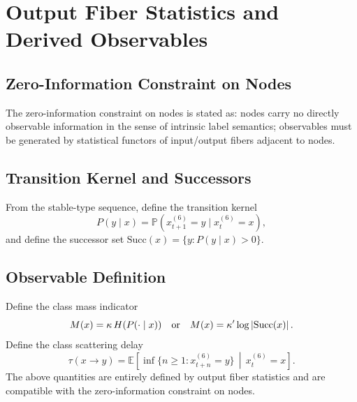 \section{Output Fiber Statistics and Derived Observables}
\label{sec:fiber-observables}

\subsection{Zero-Information Constraint on Nodes}

The zero-information constraint on nodes is stated as: nodes carry no directly observable information in the sense of intrinsic label semantics; observables must be generated by statistical functors of input/output fibers adjacent to nodes.

\subsection{Transition Kernel and Successors}

From the stable-type sequence, define the transition kernel
\[
P(y\mid x)=\mathbb{P}(x_{t+1}^{(6)}=y\mid x_t^{(6)}=x),
\]
and define the successor set $\mathrm{Succ}(x)=\{y:P(y\mid x)>0\}$.

\subsection{Observable Definition}

Define the class mass indicator
\[
M(x)=\kappa\,H(P(\cdot\mid x))\quad\text{or}\quad M(x)=\kappa'\log\left\lvert \mathrm{Succ}(x)\right\rvert.
\]
Define the class scattering delay
\[
\tau(x\to y)=\mathbb{E}\!\left[\inf\{n\ge 1:x_{t+n}^{(6)}=y\}\,\middle|\,x_t^{(6)}=x\right].
\]
The above quantities are entirely defined by output fiber statistics and are compatible with the zero-information constraint on nodes.
